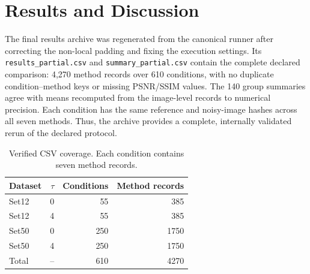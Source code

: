 \documentclass[pdflatex,iicol,sn-mathphys-num]{sn-jnl}
\newif\ifshowportuguese
\newcommand{\pt}[1]{\ifshowportuguese\par\begingroup\small\color{blue!55!black}\noindent\textbf{PT: }#1\par\endgroup\fi}
\begin{document}
\section{Results and Discussion}
\label{sec:results}

The final results archive was regenerated from the canonical runner after correcting the non-local padding and fixing the execution settings. Its \texttt{results\_partial.csv} and \texttt{summary\_partial.csv} contain the complete declared comparison: 4,270 method records over 610 conditions, with no duplicate condition--method keys or missing PSNR/SSIM values. The 140 group summaries agree with means recomputed from the image-level records to numerical precision. Each condition has the same reference and noisy-image hashes across all seven methods. Thus, the archive provides a complete, internally validated rerun of the declared protocol.
\pt{O arquivo final de resultados foi regenerado pelo executor canônico após a correção do padding não local e a fixação das configurações de execução. Seus arquivos \texttt{results\_partial.csv} e \texttt{summary\_partial.csv} contêm a comparação declarada completa: 4.270 registros de métodos em 610 condições, sem chaves duplicadas de condição e método nem valores ausentes de PSNR/SSIM. Os 140 resumos por grupo concordam, até a precisão numérica, com as médias recalculadas dos registros por imagem. Cada condição apresenta os mesmos hashes de referência e imagem ruidosa entre os sete métodos. Assim, o arquivo fornece uma reexecução completa e validada internamente do protocolo declarado.}

\begin{table}[!t]
  \centering
  \caption{Verified CSV coverage. Each condition contains seven method records.}
  \label{tab:coverage_status}
  \small
  \begin{tabular}{lrrr}
  \toprule
  Dataset & $\tau$ & Conditions & Method records \\
  \midrule
  Set12 & 0 & 55 & 385 \\
  Set12 & 4 & 55 & 385 \\
  Set50 & 0 & 250 & 1750 \\
  Set50 & 4 & 250 & 1750 \\
  \midrule
  Total & -- & 610 & 4270 \\
  \bottomrule
  \end{tabular}
  \pt{Cobertura verificada nos CSVs. Cada condição contém sete registros de métodos.}
\end{table}
\end{document}
